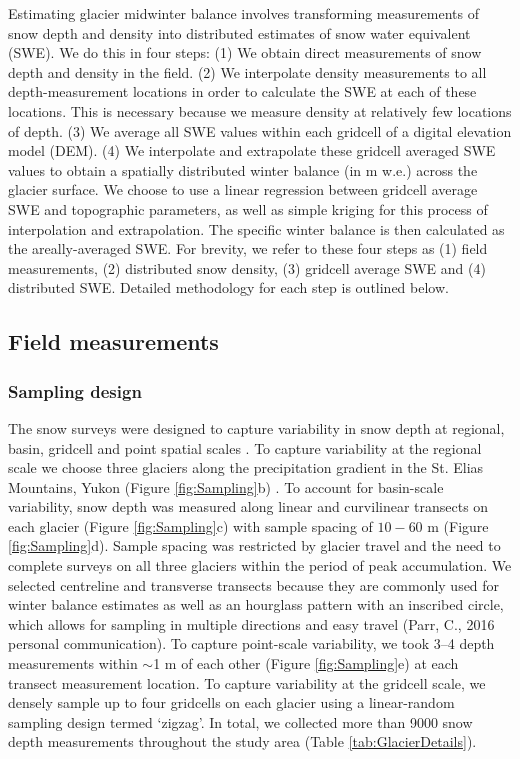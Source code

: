 \documentclass[twocolumn, letterpaper]{igs}
\begin{document}
Estimating glacier midwinter balance involves transforming measurements of snow depth and density into distributed estimates of snow water equivalent (SWE). We do this in four steps: (1) We obtain direct measurements of snow depth and density in the field. (2) We interpolate density measurements to all depth-measurement locations in order to calculate the SWE at each of these locations. This is necessary because we measure density at relatively few locations of depth. (3) We average all SWE values within each gridcell of a digital elevation model (DEM). (4) We interpolate and extrapolate these gridcell averaged SWE values to obtain a spatially distributed winter balance (in m w.e.) across the glacier surface. We choose to use a linear regression between gridcell average SWE and topographic parameters, as well as simple kriging for this process of interpolation and extrapolation. The specific winter balance is then calculated as the areally-averaged SWE. For brevity, we refer to these four steps as (1) field measurements, (2) distributed snow density, (3) gridcell average SWE and (4) distributed SWE. Detailed methodology for each step is outlined below.

\subsection{Field measurements}

\subsubsection{Sampling design}

The snow surveys were designed to capture variability in snow depth at regional, basin, gridcell and point spatial scales \citep{Clark2011}. To capture variability at the regional scale we choose three glaciers along the precipitation gradient in the St. Elias Mountains, Yukon (Figure \ref{fig:Sampling}b) \citep{Taylor1969}. To account for basin-scale variability, snow depth was measured along linear and curvilinear transects on each glacier (Figure \ref{fig:Sampling}c) with sample spacing of $10-60$ m (Figure \ref{fig:Sampling}d). Sample spacing was restricted by glacier travel and the need to complete surveys on all three glaciers within the period of peak accumulation. We selected centreline and transverse transects because they are commonly used for winter balance estimates \citep[e.g.][]{Kaser2003, Machguth2006} as well as an hourglass pattern with an inscribed circle, which allows for sampling in multiple directions and easy travel (Parr, C., 2016 personal communication). To capture point-scale variability, we took 3--4 depth measurements within $\sim$1 m of each other (Figure \ref{fig:Sampling}e) at each transect measurement location. To capture variability at the gridcell scale, we densely sample up to four gridcells on each glacier using a linear-random sampling design termed `zigzag'. In total, we collected more than 9000 snow depth measurements throughout the study area (Table \ref {tab:GlacierDetails}). 
\end{document}
